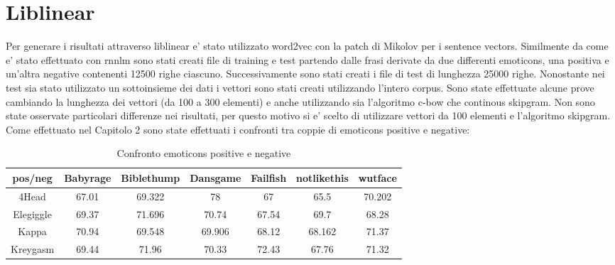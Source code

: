 \documentclass[a4paper,11pt]{book}
\theoremstyle{definition}
\begin{document}
\chapter{Liblinear}
\label{ch:liblinear}
Per generare i risultati attraverso liblinear e' stato utilizzato word2vec con la patch di Mikolov per i sentence vectors. Similmente da come e' stato effettuato con rnnlm sono stati creati file di training e test partendo dalle frasi derivate da due differenti emoticons, una positiva e un'altra negative contenenti 12500 righe ciascuno. Successivamente sono stati creati i file di test di lunghezza 25000 righe. Nonostante nei test sia stato utilizzato un sottoinsieme dei dati i vettori sono stati creati utilizzando l'intero corpus.
Sono state effettuate alcune prove cambiando la lunghezza dei vettori (da 100 a 300 elementi) e anche utilizzando sia l'algoritmo c-bow che continous skipgram. Non sono state osservate particolari differenze nei risultati, per questo motivo si e' scelto di utilizzare vettori da 100 elementi e l'algoritmo skipgram.
Come effettuato nel Capitolo 2 sono state effettuati i confronti tra coppie di emoticons positive e negative:

\begin{table}[h]
\begin{center}
\begin{tabular}{|c|c|c|c|c|c|c|}
\hline
pos/neg & Babyrage & Biblethump & Dansgame & Failfish & notlikethis & wutface \\
\hline
\hline
4Head & 67.01 &  69.322 & 78 & 67 & 65.5 & 70.202 \\
\hline
Elegiggle & 69.37 & 71.696 & 70.74 & 67.54 & 69.7 & 68.28 \\
\hline
Kappa & 70.94 & 69.548 & 69.906 & 68.12 & 68.162 & 71.37 \\
\hline
Kreygasm & 69.44 & 71.96 & 70.33 & 72.43 & 67.76 & 71.32 \\
\hline
\end{tabular}
\end{center}
\caption{Confronto emoticons positive e negative}
\label{tab:liblinearTest1}
\end{table}
\end{document}
